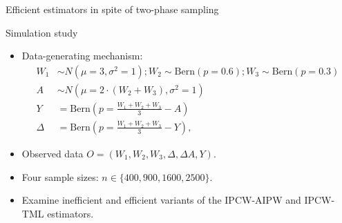 \documentclass{beamer}
\begin{document}
\begin{frame}[c]{Efficient estimators in spite of two-phase sampling}

\end{frame}


\begin{frame}[c]{Simulation study}

\begin{center}
\begin{itemize}
  \itemsep6pt
  \item Data-generating mechanism:
    \begin{align*}
      W_1 & \sim N(\mu = 3, \sigma^2 = 1);
      W_2 \sim \text{Bern}(p = 0.6);
      W_3 \sim \text{Bern}(p = 0.3) \\
      A & \sim N(\mu = 2 \cdot (W_2 + W_3), \sigma^2 = 1) \\
      Y & = \text{Bern}\left(p = \frac{W_1 + W_2 + W_3}{3} - A \right) \\
      \Delta & = \text{Bern}\left(p = \frac{W_1 + W_2 + W_3}{3} - Y \right),
    \end{align*}
  \item Observed data $O = (W_1, W_2, W_3, \Delta, \Delta A, Y)$.
  \item Four sample sizes: $n \in \{400, 900, 1600, 2500\}$.
  \item Examine inefficient and efficient variants of the IPCW-AIPW and IPCW-TML
    estimators.
\end{itemize}
\end{center}

\note{
}

\end{frame}
\end{document}
